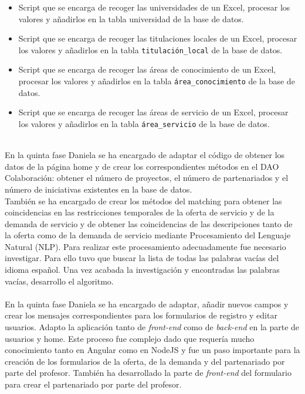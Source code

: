 \documentclass[11pt]{book}
\begin{document}
\begin{itemize} 
	\item Script que se encarga de recoger las universidades de un Excel, procesar los valores y añadirlos en la tabla universidad de la base de datos.
	\item Script que se encarga de recoger las titulaciones locales de un Excel, procesar los valores y añadirlos en la tabla \texttt{titulación\_local} de la base de datos.
	\item Script que se encarga de recoger las áreas de conocimiento de un Excel, procesar los valores y añadirlos en la tabla \texttt{área\_conocimiento} de la base de datos.
	\item Script que se encarga de recoger las áreas de servicio de un Excel, procesar los valores y añadirlos en la tabla \texttt{área\_servicio} de la base de datos.\\\\
\end{itemize}

En la quinta fase Daniela se ha encargado de adaptar el código de obtener los datos de la página home y de crear los correspondientes métodos en el DAO Colaboración: obtener el número de proyectos, el número de partenariados y el número de iniciativas existentes en la base de datos.\\ 
También se ha encargado de crear los métodos del matching para obtener las coincidencias en las restricciones temporales de la oferta de servicio y de la demanda de servicio y de obtener las coincidencias de las descripciones tanto de la oferta como de la demanda de servicio mediante Procesamiento del Lenguaje Natural (NLP). Para realizar este procesamiento adecuadamente fue necesario investigar. Para ello tuvo que buscar la lista de todas las palabras vacías del idioma español. Una vez acabada la investigación y encontradas las palabras vacías, desarrollo el algoritmo.\\\\
En la quinta fase Daniela se ha encargado de adaptar, añadir nuevos campos y crear los mensajes correspondientes para los formularios de registro y editar usuarios. Adapto la aplicación tanto de \textit{front-end} como de \textit{back-end} en la parte de usuarios y home. Este proceso fue complejo dado que requería mucho conocimiento tanto en Angular como en NodeJS y fue un paso importante para la creación de los formularios de la oferta, de la demanda y del partenariado por parte del profesor. También ha desarrollado la parte de \textit{front-end} del formulario para crear el partenariado por parte del profesor.
\end{document}
